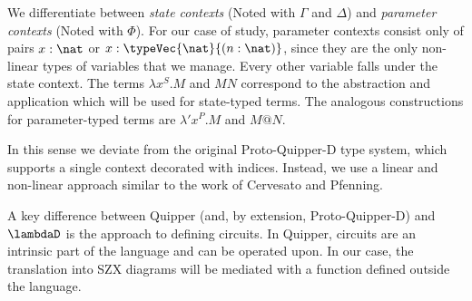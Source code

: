 We differentiate between \textit{state contexts} (Noted with $\Gamma$ and
$\Delta$) and \textit{parameter contexts} (Noted with $\Phi$). For our case of
study, parameter contexts consist only of pairs $x:\nat$ or
$x:\typeVec{\nat}{(n:\nat)}$, since they are the only non-linear types of variables
that we manage. Every other variable falls under the state context. The terms
$\lambda x^S. M$ and $MN$ correspond to the abstraction and application which
will be used for state-typed terms. The analogous constructions for
parameter-typed terms are $\lambda' x^P. M$ and $M@N$.

In this sense we deviate from the original Proto-Quipper-D type system, which
supports a single context decorated with indices. Instead, we use a linear and
non-linear approach similar to the work of Cervesato and
Pfenning\cite{Cervesato1996ALL}.

A key difference between Quipper (and, by extension, Proto-Quipper-D) and
$\lambdaD$ is the approach to defining circuits. In Quipper, circuits are an
intrinsic part of the language and can be operated upon. In our case, the
translation into SZX diagrams will be mediated with a function defined outside
the language.

